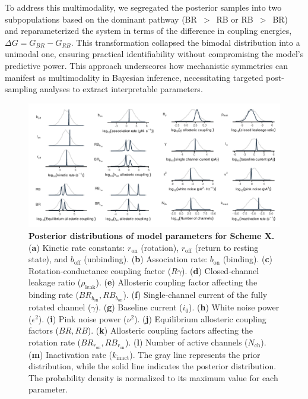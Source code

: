 \documentclass[pdflatex,sn-mathphys-num]{sn-jnl}%
\theoremstyle{thmstyleone}%
\theoremstyle{thmstyletwo}%
\theoremstyle{thmstylethree}%
\begin{document}
To address this multimodality, we segregated the posterior samples into two subpopulations based on the dominant pathway (BR~$>$~RB or RB~$>$~BR) and reparameterized the system in terms of the difference in coupling energies, \(\Delta G = G_{BR} - G_{RB}\). This transformation collapsed the bimodal distribution into a unimodal one, ensuring practical identifiability without compromising the model's predictive power. This approach underscores how mechanistic symmetries can manifest as multimodality in Bayesian inference, necessitating targeted post-sampling analyses to extract interpretable parameters.


\begin{figure}[t]
	\centering
	\includegraphics[width=\linewidth]{Figure_2.pdf}
	\caption{\textbf{Posterior distributions of model parameters for Scheme X.}  
		(\textbf{a}) Kinetic rate constants: \(r_{\text{on}}\) (rotation), \(r_{\text{off}}\) (return to resting state), and \(b_{\text{off}}\) (unbinding).  
		(\textbf{b}) Association rate: \(b_{\text{on}}\) (binding).  
		(\textbf{c}) Rotation-conductance coupling factor (\(R\gamma\)).  
		(\textbf{d}) Closed-channel leakage ratio (\(\rho_{\text{leak}}\)).  
		(\textbf{e}) Allosteric coupling factor affecting the binding rate (\(BR_{b_{\text{on}}}, RB_{b_{\text{on}}}\)).  
		(\textbf{f}) Single-channel current of the fully rotated channel (\(\gamma\)).  
		(\textbf{g}) Baseline current (\(i_0\)).  
		(\textbf{h}) White noise power (\(\epsilon^2\)).  
		(\textbf{i}) Pink noise power (\(\nu^2\)).  
		(\textbf{j}) Equilibrium allosteric coupling factors (\(BR, RB\)).  
		(\textbf{k}) Allosteric coupling factors affecting the rotation rate (\(BR_{r_{\text{on}}}, RB_{r_{\text{on}}}\)).  
		(\textbf{l}) Number of active channels (\(N_{\text{ch}}\)).  
		(\textbf{m}) Inactivation rate (\(k_{\text{inact}}\)).  
		The gray line represents the prior distribution, while the solid line indicates the posterior distribution. The probability density is normalized to its maximum value for each parameter.
	}
	\label{fig:posterior_SchemeX}
\end{figure}
\end{document}
